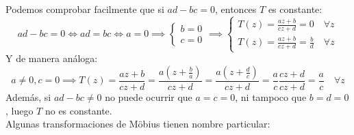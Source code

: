 Podemos comprobar facilmente que si $ad - bc = 0$, entonces $T$ es constante:
\[
ad - bc = 0 \iff
ad = bc \iff
a = 0 \implies
\begin{cases}
    b = 0 \\
    c = 0 
\end{cases} \implies
\begin{cases}
    T(z) = \frac{az + b}{cz + d} = 0 \quad \forall z \\
    T(z) = \frac{az + b}{cz + d} = \frac{b}{d} \quad \forall z
\end{cases}
\]
Y de manera análoga:
\[
a \neq 0, c = 0 \implies
T(z) = \frac{az + b}{cz + d} = 
\frac{a(z + \frac{b}{a})}{cz + d} = 
\frac{a(z + \frac{d}{c})}{cz + d} =
\frac{a}{c} \frac{cz + d}{cz + d} = 
\frac{a}{c} \quad \forall z
\]
Además, si $ad - bc \neq 0$ no puede ocurrir que $a = c = 0$, ni tampoco que $b = d = 0$, luego $T$ no es constante.\\
Algunas transformaciones de Möbius tienen nombre particular:
